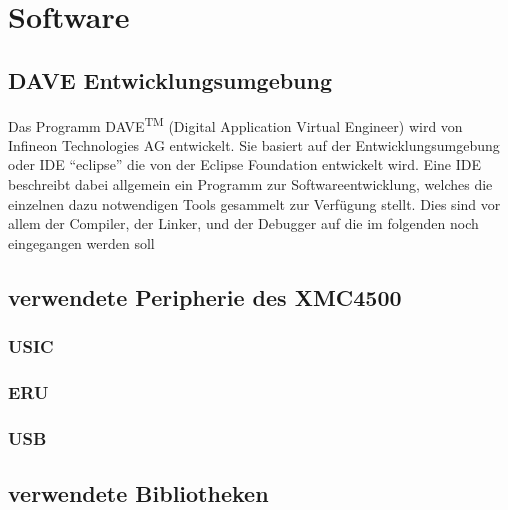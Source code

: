 \chapter{Software}
\label{sec:Software}
\pagestyle{scrheadings}
\section{DAVE Entwicklungsumgebung}

Das Programm DAVE\textsuperscript{TM} (Digital Application Virtual Engineer) wird von Infineon Technologies AG entwickelt. Sie basiert auf der Entwicklungsumgebung oder \ac{IDE} \enquote{eclipse} die von der Eclipse Foundation entwickelt wird. Eine \ac{IDE} beschreibt dabei allgemein ein Programm zur Softwareentwicklung, welches die einzelnen dazu notwendigen Tools gesammelt zur Verfügung stellt. Dies sind vor allem der Compiler, der Linker, und der Debugger auf die im folgenden noch eingegangen werden soll %




































\section{verwendete Peripherie des XMC4500}
\subsection{USIC}
\subsection{ERU}
\subsection{USB}
\section{verwendete Bibliotheken}
